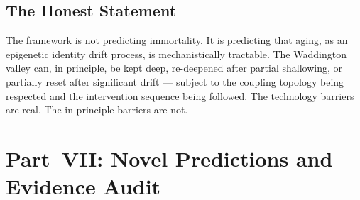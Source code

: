 \documentclass[12pt,a4paper]{article}
\begin{document}
\subsection{The Honest Statement}

The framework is not predicting immortality. It is predicting that aging, as an
epigenetic identity drift process, is mechanistically tractable. The Waddington
valley can, in principle, be kept deep, re-deepened after partial shallowing,
or partially reset after significant drift --- subject to the coupling topology
being respected and the intervention sequence being followed. The technology
barriers are real. The in-principle barriers are not.

\section{Part~VII: Novel Predictions and Evidence Audit}
\end{document}
